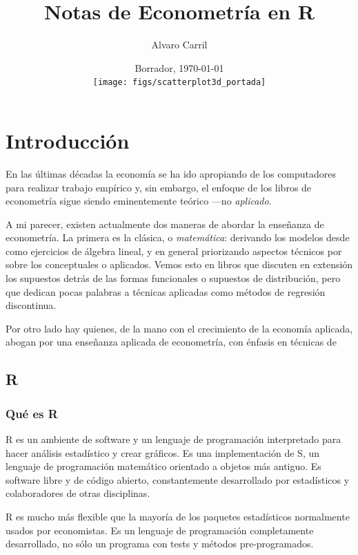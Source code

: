 \documentclass{report}\usepackage[]{graphicx}\usepackage[]{color}
\title{Notas de Econometría en R}
\author{Alvaro Carril}
\date{Borrador, \today \\
  \texttt{[image: figs/scatterplot3d\_portada]}
}
\begin{document}
\maketitle
\tableofcontents

\clearpage




\chapter{Introducción}

En las últimas décadas la economía se ha ido apropiando de los computadores para realizar trabajo empírico y, sin embargo, el enfoque de los libros de econometría sigue siendo eminentemente teórico ---no \emph{aplicado}.

A mi parecer, existen actualmente dos maneras de abordar la enseñanza de econometría. La primera es la clásica, o \emph{matemática}: derivando los modelos desde como ejercicios de álgebra lineal, y en general priorizando aspectos técnicos por sobre los conceptuales o aplicados. Vemos esto en libros que discuten en extensión los supuestos detrás de las formas funcionales o supuestos de distribución, pero que dedican pocas palabras a técnicas aplicadas como métodos de regresión discontinua.

Por otro lado hay quienes, de la mano con el crecimiento de la economía aplicada, abogan por una enseñanza aplicada de econometría, con énfasis en técnicas de 

\section{R}

\subsection{Qué es R}

R es un ambiente de software y un lenguaje de programación interpretado para hacer análisis estadístico y crear gráficos. Es una implementación de S, un lenguaje de programación matemático orientado a objetos más antiguo. Es software libre y de código abierto, constantemente desarrollado por estadísticos y colaboradores de otras disciplinas.

R es mucho más flexible que la mayoría de los paquetes estadísticos normalmente usados por economistas. Es un lenguaje de programación completamente desarrollado, no sólo un programa con tests y métodos pre-programados.
\end{document}
